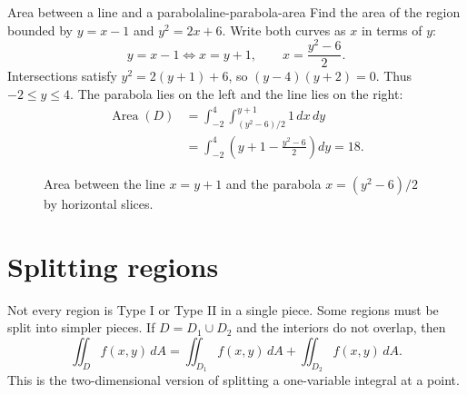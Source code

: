 \documentclass[11pt]{article}
\newcommand{\Area}{\operatorname{Area}}
\begin{document}
\begin{examplebox}{Area between a line and a parabola}{line-parabola-area}
Find the area of the region bounded by $y=x-1$ and $y^2=2x+6$.
Write both curves as $x$ in terms of $y$:
\[
y=x-1\Longleftrightarrow x=y+1,
\qquad
x=\frac{y^2-6}{2}.
\]
Intersections satisfy $y^2=2(y+1)+6$, so $(y-4)(y+2)=0$. Thus $-2\le y\le 4$. The parabola lies on the left and the line lies on the right:
\[
\begin{aligned}
\Area(D)&=\int_{-2}^{4}\int_{(y^2-6)/2}^{y+1}1\,dx\,dy \\
&=\int_{-2}^{4}\left(y+1-\frac{y^2-6}{2}\right)dy
=18.
\end{aligned}
\]
\end{examplebox}

\begin{figure}[H]
\centering
{}
\caption{Area between the line $x=y+1$ and the parabola $x=(y^2-6)/2$ by horizontal slices.}
\end{figure}

\section{Splitting regions}

Not every region is Type I or Type II in a single piece. Some regions must be split into simpler pieces. If $D=D_1\cup D_2$ and the interiors do not overlap, then
\[
\iint_D f(x,y)\,dA=\iint_{D_1}f(x,y)\,dA+\iint_{D_2}f(x,y)\,dA.
\]
This is the two-dimensional version of splitting a one-variable integral at a point.
\end{document}
